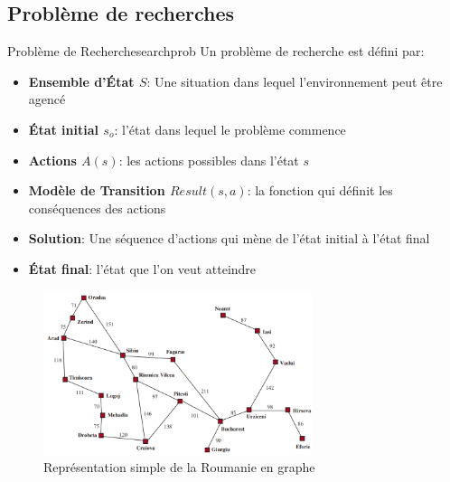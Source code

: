 \subsection{Problème de recherches} %
\label{sub:probleme_de_recherches}

\begin{definition}{Problème de Recherche}{searchprob}
    Un problème de recherche est défini par:
    \begin{itemize}
        \item \textbf{Ensemble d'État $S$}: Une situation dans lequel l'environnement peut être agencé
        \item \textbf{État initial $s_o$}: l'état dans lequel le problème commence
        \item \textbf{Actions $A(s)$}: les actions possibles dans l'état $s$
        \item \textbf{Modèle de Transition $Result(s, a)$}: la fonction qui définit les conséquences des actions
        \item \textbf{Solution}: Une séquence d'actions qui mène de l'état initial à l'état final
        \item \textbf{État final}: l'état que l'on veut atteindre
    \end{itemize}
\end{definition}


\begin{figure}[H]
    \begin{center}
        \includegraphics[width=0.70\textwidth]{./pictures/roumanie.png}
    \end{center}
    \caption{Représentation simple de la Roumanie en graphe}\label{fig:romania}
\end{figure}




